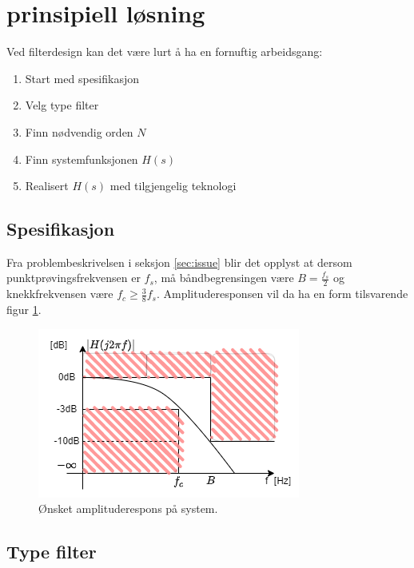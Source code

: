 \section{prinsipiell løsning}
\label{sec:concept}

Ved filterdesign kan det være lurt å ha en fornuftig arbeidsgang:

\begin{enumerate}
    \item Start med spesifikasjon
    \item Velg type filter
    \item Finn nødvendig orden $N$
    \item Finn systemfunksjonen $H(s)$
    \item Realisert $H(s)$ med tilgjengelig teknologi
  \end{enumerate}

\subsection{Spesifikasjon}
\label{sec:spesifikasjon}
Fra problembeskrivelsen i seksjon \ref{sec:issue} blir det opplyst at dersom punktprøvingsfrekvensen er $f_s$, må båndbegrensingen være $B=\frac {f_s} {2}$ og knekkfrekvensen være $f_c \geq \frac{3}{8}f_s$. Amplituderesponsen vil da ha en form tilsvarende figur \ref{fig:02ønsketamplituderespons}.

\begin{figure}[H]
	\centering
	\includegraphics[scale=0.7]{./Images/02Concept/01spesifikasjon.png}
	\caption{Ønsket amplituderespons på system.\cite{pham_2022_selvlaget}}
	\label{fig:02ønsketamplituderespons}
\end{figure}

\subsection{Type filter}
\label{sec:type_filter}

